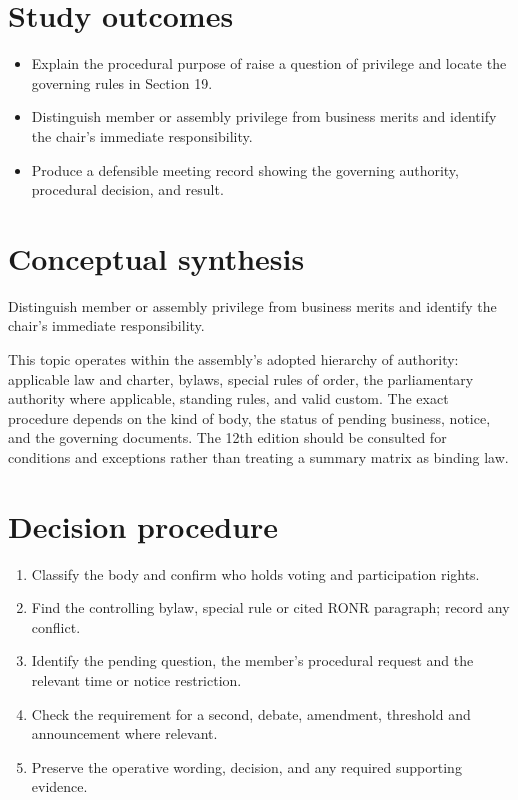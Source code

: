 \documentclass[11pt]{article}
\begin{document}
\SuiteOpen
{}
\section{Study outcomes}
\begin{itemize}[leftmargin=*,itemsep=4pt]
\item Explain the procedural purpose of raise a question of privilege and locate the governing rules in Section 19.
\item Distinguish member or assembly privilege from business merits and identify the chair’s immediate responsibility.
\item Produce a defensible meeting record showing the governing authority, procedural decision, and result.
\end{itemize}

\section{Conceptual synthesis}
Distinguish member or assembly privilege from business merits and identify the chair’s immediate responsibility.

This topic operates within the assembly’s adopted hierarchy of authority: applicable law and charter, bylaws, special rules of order, the parliamentary authority where applicable, standing rules, and valid custom. The exact procedure depends on the kind of body, the status of pending business, notice, and the governing documents. The 12th edition should be consulted for conditions and exceptions rather than treating a summary matrix as binding law.
\section{Decision procedure}
\begin{enumerate}[leftmargin=*,itemsep=4pt]
\item Classify the body and confirm who holds voting and participation rights.
\item Find the controlling bylaw, special rule or cited RONR paragraph; record any conflict.
\item Identify the pending question, the member’s procedural request and the relevant time or notice restriction.
\item Check the requirement for a second, debate, amendment, threshold and announcement where relevant.
\item Preserve the operative wording, decision, and any required supporting evidence.
\end{enumerate}
\end{document}
